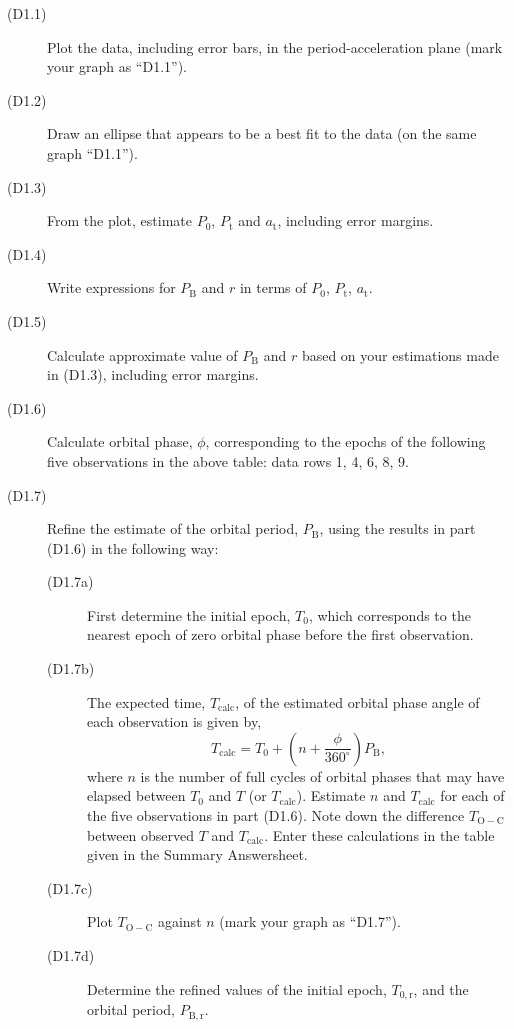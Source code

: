 \begin{description}
\item[(D1.1)] Plot the data, including error bars, in the
  period-acceleration plane (mark your graph as ``D1.1'').
\item[(D1.2)] Draw an ellipse that appears to be a best fit to the data (on
  the same graph ``D1.1'').
\item[(D1.3)] From the plot, estimate $P_0$, $P_{\mathrm{t}}$ and
  $a_{\mathrm{t}}$, including error margins.
\item[(D1.4)] Write expressions for $P_{\mathrm{B}}$ and $r$ in terms of
  $P_0$, $P_{\mathrm{t}}$, $a_{\mathrm{t}}$.
\item[(D1.5)] Calculate approximate value of $P_{\mathrm{B}}$ and $r$ based
  on your estimations made in (D1.3), including error margins.
\item[(D1.6)] Calculate orbital phase, $\phi$, corresponding to the epochs
  of the following five observations in the above table: data rows 1, 4, 6,
  8, 9.
\item[(D1.7)] Refine the estimate of the orbital period, $P_{\mathrm{B}}$,
  using the results in part (D1.6) in the following way:
  \begin{description}
  \item[(D1.7a)] First determine the initial epoch, $T_0$, which corresponds
    to the nearest epoch of zero orbital phase before the first observation.
  \item[(D1.7b)] The expected time, $T_{\mathrm{calc}}$, of the estimated
    orbital phase angle of each observation is given by,
    \[ T_{\mathrm{calc}} = T_0
       + \left(n + \frac{\phi}{360^\circ}\right) P_{\mathrm{B}}, \]
    where $n$ is the number of full cycles of orbital phases that may have
    elapsed between $T_0$ and $T$ (or $T_{\mathrm{calc}}$). Estimate $n$ and
    $T_{\mathrm{calc}}$ for each of the five observations in part (D1.6).
    Note down the difference $T_{\mathrm{O-C}}$ between observed $T$ and
    $T_{\mathrm{calc}}$. Enter these calculations in the table given in the
    Summary Answersheet.
  \item[(D1.7c)] Plot $T_{\mathrm{O-C}}$ against $n$ (mark your graph as
    ``D1.7'').
  \item[(D1.7d)] Determine the refined values of the initial epoch,
    $T_{0,\mathrm{r}}$, and the orbital period, $P_{\mathrm{B,r}}$.
  \end{description}
\end{description}

